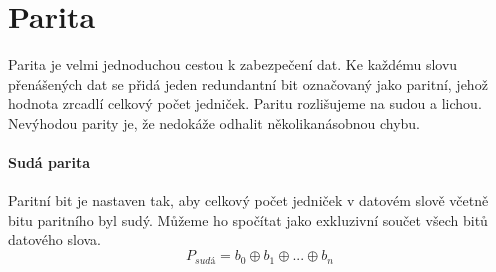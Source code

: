
\section{Parita}
Parita je velmi jednoduchou cestou k zabezpečení dat. Ke každému slovu přenášených dat se přidá jeden redundantní bit označovaný jako paritní, jehož hodnota zrcadlí celkový počet jedniček. Paritu rozlišujeme na sudou a lichou. Nevýhodou parity je, že nedokáže odhalit několikanásobnou chybu.

\paragraph{Sudá parita}
Paritní bit je nastaven tak, aby celkový počet jedniček v datovém slově včetně bitu paritního byl sudý. Můžeme ho spočítat jako exkluzivní součet všech bitů datového slova.
$$ P_{sudá} = b_0 \oplus b_1 \oplus ... \oplus b_n $$

